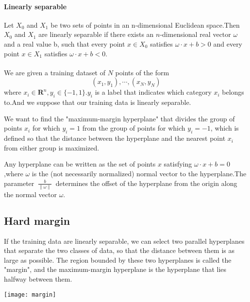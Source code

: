\paragraph{Linearly separable} Let $\displaystyle X_{0}$ and $\displaystyle X_{1}$  be two sets of points in an n-dimensional Euclidean space.Then $\displaystyle X_{0}$ and $\displaystyle X_{1}$ are linearly separable if there exists an $n$-dimensional real vector $\omega$ and a real value b, such that every point $\displaystyle x\in X_{0}$ satisfies $\displaystyle\omega\cdot x+b>0$ and every point $\displaystyle x\in X_{1}$ satisfies $\displaystyle \omega\cdot x+b<0$.
\\
\\We are given a training dataset of $\displaystyle N$ points of the form
$$(x_{1},y_{1}),\cdots,(x_{N},y_{N})$$
where $\displaystyle x_{i}\in \mathbf{R}^n,y_{i}\in \{-1,1\}$.$\displaystyle y_{i}$ is a label that indicates which category $\displaystyle x_{i}$ belongs  to.And we suppose that our training data is linearly separable.
\par We want to find the "maximum-margin hyperplane" that divides the group of points $x_{i}$ for which $\displaystyle y_{i}=1$ from the group of points for which $\displaystyle y_{i}=-1$, which is defined so that the distance between the hyperplane and the nearest point $\displaystyle x_{i}$ from either group is maximized.
\par Any hyperplane can be written as the set of points $\displaystyle x$ satisfying $\displaystyle \omega\cdot x+b=0$,where $\displaystyle \omega$ is the (not necessarily normalized) normal vector to the hyperplane.The parameter $\displaystyle\ \frac{b}{\|\omega\|}\ $ determines the offset of the hyperplane from the origin along the normal vector $\displaystyle\omega$.

\subsection{Hard margin}

If the training data are linearly separable, we can select two parallel hyperplanes that separate the two classes of data, so that the distance between them is as large as possible. The region bounded by these two hyperplanes is called the "margin", and the maximum-margin hyperplane is the hyperplane that lies halfway between them.
\noindent

\texttt{[image: margin]}

